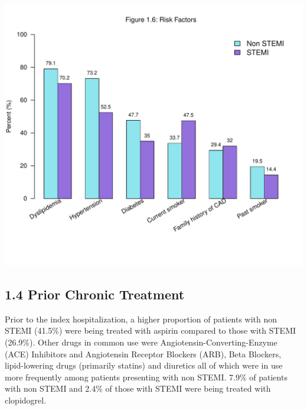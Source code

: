 \documentclass[
]{article}
\begin{document}
\includegraphics{‏‏ACSIS_2024_v1_with_trend_pdf_files/figure-latex/unnamed-chunk-23-1.pdf}

\pagebreak

\subsection{1.4 Prior Chronic Treatment}\label{prior-chronic-treatment}

Prior to the index hospitalization, a higher proportion of patients with
non STEMI (41.5\%) were being treated with aspirin compared to those
with STEMI (26.9\%). Other drugs in common use were
Angiotensin-Converting-Enzyme (ACE) Inhibitors and Angiotensin Receptor
Blockers (ARB), Beta Blockers, lipid-lowering drugs (primarily statins)
and diuretics all of which were in use more frequently among patients
presenting with non STEMI. 7.9\% of patients with non STEMI and 2.4\% of
those with STEMI were being treated with clopidogrel.

~
\end{document}
